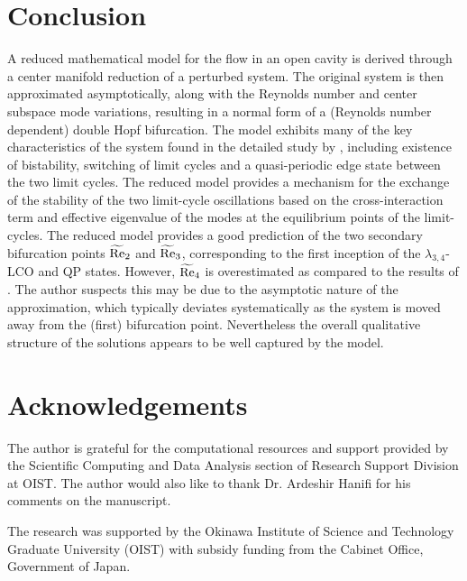 \section{Conclusion}
\label{sec:conclusion}

A reduced mathematical model for the flow in an open cavity is derived through a center manifold reduction of a perturbed system. The original system is then approximated asymptotically, along with the Reynolds number and center subspace mode variations, resulting in a normal form of a (Reynolds number dependent) double Hopf bifurcation. The model exhibits many of the key characteristics of the system found in the detailed study by \cite{bengana19}, including existence of bistability, switching of limit cycles and a quasi-periodic edge state between the two limit cycles. The reduced model provides a mechanism for the exchange of the stability of the two limit-cycle oscillations based on the cross-interaction term and effective eigenvalue of the modes at the equilibrium points of the limit-cycles. The reduced model provides a good prediction of the two secondary bifurcation points $\widetilde{\mathrm{Re}}_{2}$ and $\widetilde{\mathrm{Re}}_{3}$, corresponding to the first inception of the $\lambda_{3,4}$-LCO and QP states. However, $\widetilde{\mathrm{Re}}_{4}$ is overestimated as compared to the results of \cite{bengana19}. The author suspects this may be due to the asymptotic nature of the approximation, which typically deviates systematically as the system is moved away from the (first) bifurcation point. Nevertheless the overall qualitative structure of the solutions appears to be well captured by the model. 

\section*{Acknowledgements}
The author is grateful for the computational resources and support provided by the Scientific Computing and Data Analysis section of Research Support Division at OIST. The author would also like to thank Dr. Ardeshir Hanifi for his comments on the manuscript.

The research was supported by the Okinawa Institute of Science and Technology Graduate	University (OIST) with subsidy funding from the Cabinet Office, Government of Japan.


